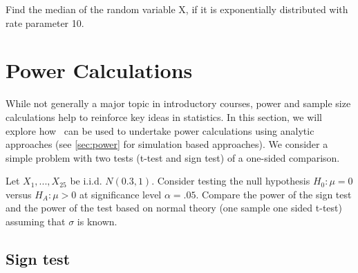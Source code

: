 \begin{problem}
Find the median of the random variable X, if it is exponentially distributed
with rate parameter 10.
\end{problem}
\begin{solution}
\begin{knitrout}
\end{knitrout}

\end{solution}


\section{Power Calculations}

\label{sec:onesamppower}

While not generally a major topic in introductory courses, power and sample size calculations
help to reinforce key ideas in statistics.  In this section, we will explore how \R\ can 
be used to undertake power calculations using analytic approaches (see \ref{sec:power}
for simulation based approaches).  We consider a simple problem with two tests (t-test and
sign test) of
a one-sided comparison.

Let $X_1, ..., X_{25}$ be i.i.d. $N(0.3, 1)$.  Consider testing the null hypothesis $H_0: \mu=0$ versus $H_A: \mu>0$ at significance level $\alpha=.05$.  Compare the power of the sign test and the power of the test based on normal theory (one sample one sided t-test) assuming that $\sigma$ 
is known.

\subsection{Sign test}

